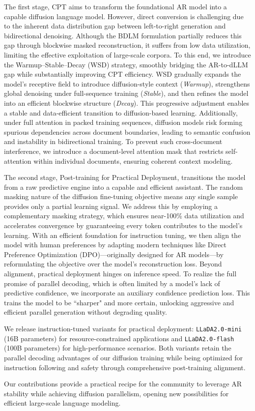 The first stage, CPT aims to transform the foundational AR model into a capable diffusion language model. However, direct conversion is challenging due to the inherent data distribution gap between left-to-right generation and bidirectional denoising. Although the BDLM formulation partially reduces this gap through blockwise masked reconstruction, it suffers from low data utilization, limiting the effective exploitation of large-scale corpora. To this end, we introduce the Warmup–Stable–Decay (WSD) strategy, smoothly bridging the AR-to-dLLM gap while substantially improving CPT efficiency. WSD gradually expands the model’s receptive field to introduce diffusion-style context (\textit{Warmup}), strengthens global denoising under full-sequence training (\textit{Stable}), and then refines the model into an efficient blockwise structure (\textit{Decay}). This progressive adjustment enables a stable and data-efficient transition to diffusion-based learning. Additionally, under full attention in packed training sequences, diffusion models risk forming spurious dependencies across document boundaries, leading to semantic confusion and instability in bidirectional training. To prevent such cross-document interference, we introduce a document-level attention mask that restricts self-attention within individual documents, ensuring coherent context modeling.


The second stage, Post-training for Practical Deployment, transitions the model from a raw predictive engine into a capable and efficient assistant. The random masking nature of the diffusion fine-tuning objective means any single sample provides only a partial learning signal. We address this by employing a complementary masking strategy, which ensures near-100\% data utilization and accelerates convergence by guaranteeing every token contributes to the model's learning. With an efficient foundation for instruction tuning, we then align the model with human preferences by adapting modern techniques like Direct Preference Optimization (DPO)—originally designed for AR models—by reformulating the objective over the model's reconstruction loss. Beyond alignment, practical deployment hinges on inference speed. To realize the full promise of parallel decoding, which is often limited by a model's lack of predictive confidence, we incorporate an auxiliary confidence prediction loss. This trains the model to be ``sharper" and more certain, unlocking aggressive and efficient parallel generation without degrading quality.


We release instruction-tuned variants for practical deployment: \texttt{LLaDA2.0-mini} (16B parameters) for resource-constrained applications and \texttt{LLaDA2.0-flash} (100B parameters) for high-performance scenarios. Both variants retain the parallel decoding advantages of our diffusion training while being optimized for instruction following and safety through comprehensive post-training alignment.

Our contributions provide a practical recipe for the community to leverage AR stability while achieving diffusion parallelism, opening new possibilities for efficient large-scale language modeling.
